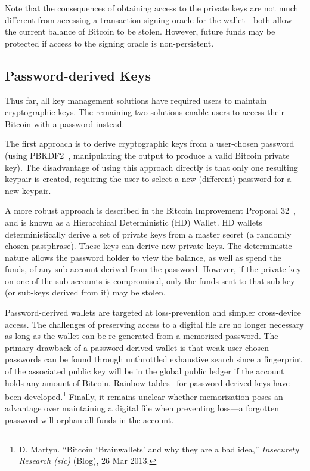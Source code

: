 Note that the consequences of obtaining access to the private keys are not much different from accessing a transaction-signing oracle for the wallet---both allow the current balance of Bitcoin to be stolen. However, future funds may be protected if access to the signing oracle is non-persistent. 

\subsection{Password-derived Keys} 
Thus far, all key management solutions have required users to maintain cryptographic keys. The remaining two solutions enable users to access their Bitcoin with a password instead. 

The first approach is to derive cryptographic keys from a user-chosen password (\eg using PBKDF2~\cite{pbkdf2}, manipulating the output to produce a valid Bitcoin private key). The disadvantage of using this approach directly is that only one resulting keypair is created, requiring the user to select a new (different) password for a new keypair. 

A more robust approach is described in the Bitcoin Improvement Proposal 32~\cite{bip32}, and is known as a Hierarchical Deterministic (HD) Wallet. HD wallets deterministically derive a set of private keys from a master secret (a randomly chosen passphrase). These keys can derive new private keys. The deterministic nature allows the password holder to view the balance, as well as spend the funds, of any sub-account derived from the password. However, if the private key on one of the sub-accounts is compromised, only the funds sent to that sub-key (or sub-keys derived from it) may be stolen. 


Password-derived wallets are targeted at loss-prevention and simpler cross-device access. The challenges of preserving access to a digital file are no longer necessary as long as the wallet can be re-generated from a memorized password. The primary drawback of a password-derived wallet is that weak user-chosen passwords can be found through unthrottled exhaustive search since a fingerprint of the associated public key will be in the global public ledger if the account holds any amount of Bitcoin. Rainbow tables~\cite{oechslin2003making} for password-derived keys have been developed.\footnote{D. Martyn. ``Bitcoin `Brainwallets' and why they are a bad idea,'' \textit{Insecurety Research \emph{(sic)}} (Blog), 26 Mar 2013.} Finally, it remains unclear whether memorization poses an advantage over maintaining a digital file when preventing loss---a forgotten password will orphan all funds in the account.


